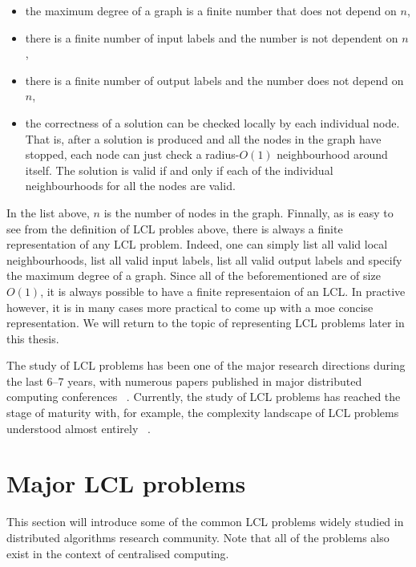 \begin{itemize}

\item the maximum degree of a graph is a finite number that does not depend on $n$,

\item there is a finite number of input labels and the number is not dependent on $n$,

\item there is a finite number of output labels and the number does not depend on $n$,

\item the correctness of a solution can be checked locally by each individual node. That is,
after a solution is produced and all the nodes in the graph have stopped, each node can just
check a radius-$O(1)$ neighbourhood around itself. The solution is valid if and only if each of
the individual neighbourhoods for all the nodes are valid.

\end{itemize}
In the list above, $n$ is the number of nodes in the graph. Finnally, as is easy to see from the definition of LCL
probles
above, there is always a finite representation of any LCL problem. Indeed, one can simply list
all valid local neighbourhoods, list all valid input labels, list all valid output
labels and specify the maximum degree of a graph. Since all of the beforementioned are
of size $O(1)$, it is always possible to have a finite representaion of an LCL.
In practive however, it is in many cases more practical to come up with
a moe concise representation. We will return to the topic of representing LCL
problems later in this thesis.

The study of LCL problems has been one of the major research directions
during the last 6--7 years, with numerous papers published in major
distributed computing conferences
~\cite{Balliu2016, Chang2016, Brandt2017, Chang2017, Fischer2017a, Rozhon2019, Balliu2020-1, Balliu2020-2}.
Currently, the study of LCL problems has reached the stage of maturity with,
for example, the complexity landscape of LCL problems understood
almost entirely ~\cite{Suomela2020, Chang2020a}.

\section{Major LCL problems}

This section will introduce some of the common LCL problems
widely studied in distributed algorithms research community.
Note that all of the problems also exist in the context of 
centralised computing.

